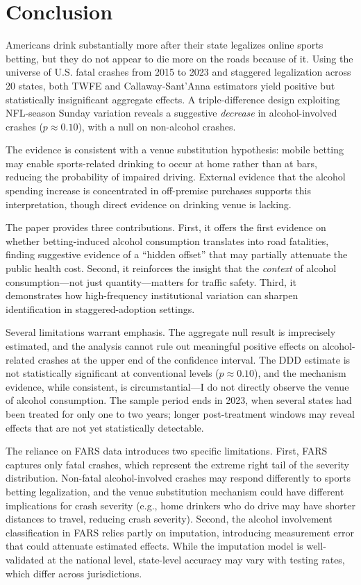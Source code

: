\documentclass[12pt]{article}
\begin{document}
\section{Conclusion}
\label{sec:conclusion}

Americans drink substantially more after their state legalizes online sports betting, but they do not appear to die more on the roads because of it. Using the universe of U.S. fatal crashes from 2015 to 2023 and staggered legalization across 20 states, both TWFE and Callaway-Sant'Anna estimators yield positive but statistically insignificant aggregate effects. A triple-difference design exploiting NFL-season Sunday variation reveals a suggestive \emph{decrease} in alcohol-involved crashes ($p \approx 0.10$), with a null on non-alcohol crashes.

The evidence is consistent with a venue substitution hypothesis: mobile betting may enable sports-related drinking to occur at home rather than at bars, reducing the probability of impaired driving. External evidence that the alcohol spending increase is concentrated in off-premise purchases \citep{taylor2024betting} supports this interpretation, though direct evidence on drinking venue is lacking.

The paper provides three contributions. First, it offers the first evidence on whether betting-induced alcohol consumption translates into road fatalities, finding suggestive evidence of a ``hidden offset'' that may partially attenuate the public health cost. Second, it reinforces the insight that the \emph{context} of alcohol consumption---not just quantity---matters for traffic safety. Third, it demonstrates how high-frequency institutional variation can sharpen identification in staggered-adoption settings.

Several limitations warrant emphasis. The aggregate null result is imprecisely estimated, and the analysis cannot rule out meaningful positive effects on alcohol-related crashes at the upper end of the confidence interval. The DDD estimate is not statistically significant at conventional levels ($p \approx 0.10$), and the mechanism evidence, while consistent, is circumstantial---I do not directly observe the venue of alcohol consumption. The sample period ends in 2023, when several states had been treated for only one to two years; longer post-treatment windows may reveal effects that are not yet statistically detectable.

The reliance on FARS data introduces two specific limitations. First, FARS captures only fatal crashes, which represent the extreme right tail of the severity distribution. Non-fatal alcohol-involved crashes may respond differently to sports betting legalization, and the venue substitution mechanism could have different implications for crash severity (e.g., home drinkers who do drive may have shorter distances to travel, reducing crash severity). Second, the alcohol involvement classification in FARS relies partly on imputation, introducing measurement error that could attenuate estimated effects. While the imputation model is well-validated at the national level, state-level accuracy may vary with testing rates, which differ across jurisdictions.
\end{document}
